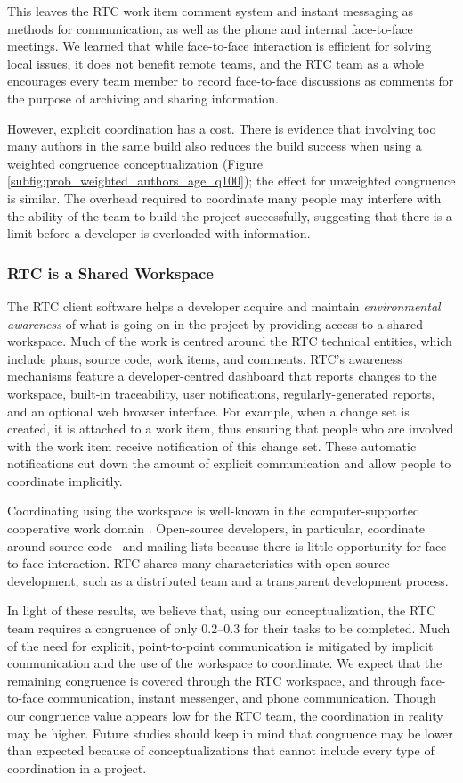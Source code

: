 This leaves the RTC work item comment system and instant messaging as methods for communication, as well as the phone and internal face-to-face meetings.
We learned that while face-to-face interaction is efficient for solving local issues, it does not benefit remote teams, and the RTC team as a whole encourages every team member to record face-to-face discussions as comments for the purpose of archiving and sharing information.

However, explicit coordination has a cost. There is evidence that involving too many authors in the same build also reduces the build success when using a weighted congruence conceptualization (Figure \ref{subfig:prob_weighted_authors_age_q100}); the effect for unweighted congruence is similar. The overhead required to coordinate many people may interfere with the ability of the team to build the project successfully, suggesting that there is a limit before a developer is overloaded with information.

\subsubsection{RTC is a Shared Workspace}
The RTC client software helps a developer acquire and maintain \emph{environmental awareness} of what is going on in the project by providing access to a shared workspace. Much of the work is centred around the RTC technical entities, which include plans, source code, work items, and comments.
RTC's awareness mechanisms feature a developer-centred dashboard that reports changes to the workspace, built-in traceability, user notifications, regularly-generated reports, and an optional web browser interface. For example, when a change set is created, it is attached to a work item, thus ensuring that people who are involved with the work item receive notification of this change set. These automatic notifications cut down the amount of explicit communication and allow people to coordinate implicitly.

Coordinating using the workspace is well-known in the computer-supported cooperative work domain \cite{schmidt1996}. Open-source developers, in particular, coordinate around source code~\cite{bolici:stc:2009} and mailing lists \cite{gutwin2004:awareness,mockus2002:opensource} because there is little opportunity for face-to-face interaction. RTC shares many characteristics with open-source development, such as a distributed team and a transparent development process.

In light of these results, we believe that, using our conceptualization, the RTC team requires a congruence of only 0.2--0.3 for their tasks to be completed.
Much of the need for explicit, point-to-point communication is mitigated by implicit communication and the use of the workspace to coordinate.
We expect that the remaining congruence is covered through the RTC workspace, and through face-to-face communication, instant messenger, and phone communication. Though our congruence value appears low for the RTC team, the coordination in reality may be higher. Future studies should keep in mind that congruence may be lower than expected because of conceptualizations that cannot include every type of coordination in a project.

